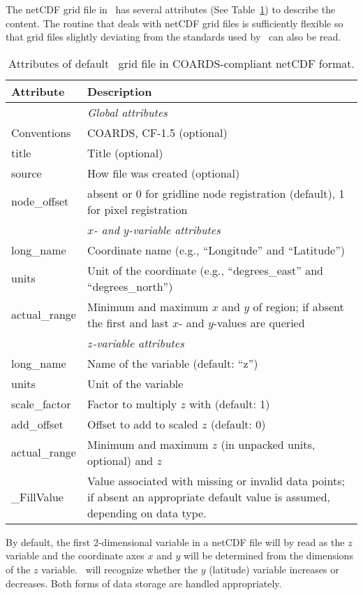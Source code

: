 The netCDF grid file in \GMT\ has several attributes (See Table~\ref{tbl:netcdf-format})
to describe the content. The routine
that deals with netCDF grid files is sufficiently flexible so that grid files slightly deviating
from the standards used by \GMT\ can also be read.

\begin{table}
\centering
\begin{tabular}{lp{}} \hline
  \textbf{Attribute}	& \textbf{Description} \\ \hline\hline
  					& \emph{Global attributes} \\
  Conventions		& COARDS, CF-1.5 (optional) \\
  title				& Title (optional) \\
  source			& How file was created (optional) \\
  node\_offset		& absent or 0 for gridline node registration (default), 1 for pixel registration \\ \hline
  					& \emph{$x$- and $y$-variable attributes} \\
  long\_name		& Coordinate name (e.g., ``Longitude'' and ``Latitude'') \\
  units				& Unit of the coordinate (e.g., ``degrees\_east'' and ``degrees\_north'') \\
  actual\_range		& Minimum and maximum $x$ and $y$
  of region; if absent the first and last $x$- and $y$-values are
  queried \\ \hline
  					& \emph{$z$-variable attributes} \\
  long\_name		& Name of the variable (default: ``z'') \\
  units				& Unit of the variable \\
  scale\_factor		& Factor to multiply $z$ with (default: 1) \\
  add\_offset		& Offset to add to scaled $z$ (default: 0) \\
  actual\_range		& Minimum and maximum $z$ (in
  unpacked units, optional) and $z$ \\
  \_FillValue			& Value associated with missing or
  invalid data points; if absent an appropriate default value is
  assumed, depending on data type. \\ \hline
\end{tabular}
\caption{Attributes of default \gmt\ grid file in COARDS-compliant netCDF format.}
\label{tbl:netcdf-format}
\end{table}

By default, the first 2-dimensional variable in a netCDF file will by read as the $z$ variable
and the coordinate axes $x$ and $y$ will be determined from the dimensions of the $z$ variable.
\GMT\ will recognize whether the $y$ (latitude) variable increases or decreases. Both forms of
data storage are handled appropriately.

